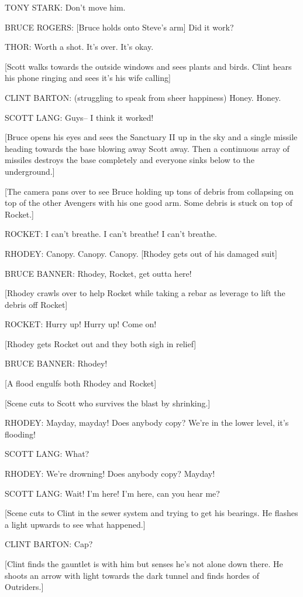 TONY STARK: Don't move him.

BRUCE ROGERS: [Bruce holds onto Steve's arm] Did it work?

THOR: Worth a shot. It's over. It's okay.

[Scott walks towards the outside windows and sees plants and birds. Clint hears his phone ringing and sees it's his wife calling]

CLINT BARTON: (struggling to speak from sheer happiness) Honey. Honey.

SCOTT LANG: Guys– I think it worked!

[Bruce opens his eyes and sees the Sanctuary II up in the sky and a single missile heading towards the base blowing away Scott away. Then a continuous array of missiles destroys the base completely and everyone sinks below to the underground.]

[The camera pans over to see Bruce holding up tons of debris from collapsing on top of the other Avengers with his one good arm. Some debris is stuck on top of Rocket.]

ROCKET: I can't breathe. I can't breathe! I can't breathe.

RHODEY: Canopy. Canopy. Canopy. [Rhodey gets out of his damaged suit]

BRUCE BANNER: Rhodey, Rocket, get outta here!

[Rhodey crawls over to help Rocket while taking a rebar as leverage to lift the debris off Rocket]

ROCKET: Hurry up! Hurry up! Come on!

[Rhodey gets Rocket out and they both sigh in relief]

BRUCE BANNER: Rhodey!

[A flood engulfs both Rhodey and Rocket]

[Scene cuts to Scott who survives the blast by shrinking.]

RHODEY: Mayday, mayday! Does anybody copy? We're in the lower level, it's flooding!

SCOTT LANG: What?

RHODEY: We're drowning! Does anybody copy? Mayday!

SCOTT LANG: Wait! I'm here! I'm here, can you hear me?

[Scene cuts to Clint in the sewer system and trying to get his bearings. He flashes a light upwards to see what happened.]

CLINT BARTON: Cap?

[Clint finds the gauntlet is with him but senses he's not alone down there. He shoots an arrow with light towards the dark tunnel and finds hordes of Outriders.]

